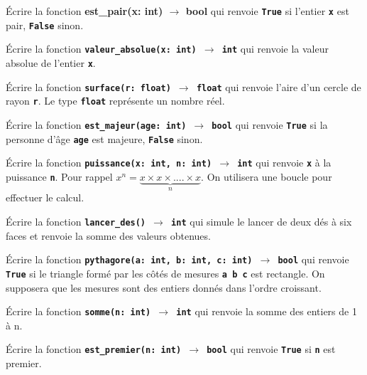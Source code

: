\documentclass[a4paper,11pt]{article}
\begin{document}
\begin{exo}
    Écrire la fonction \textbf{est\_pair(x: int) $\rightarrow$ bool} qui renvoie \textbf{\texttt{True}} si l'entier \textbf{\texttt{x}} est pair, \textbf{\texttt{False}} sinon.
\end{exo}
\begin{exo}
    Écrire la fonction \texttt{\textbf{valeur\_absolue(x: int) $\rightarrow$ int}} qui renvoie la valeur absolue de l'entier \textbf{\texttt{x}}.
\end{exo}
\begin{exo}
    Écrire la fonction \texttt{\textbf{surface(r: float) $\rightarrow$ float}} qui renvoie l'aire d'un cercle de rayon \textbf{\texttt{r}}. Le type \textbf{\texttt{float}} représente un nombre réel.
\end{exo}
\begin{exo}
    Écrire la fonction \texttt{\textbf{est\_majeur(age: int) $\rightarrow$ bool}} qui renvoie \textbf{\texttt{True}} si la personne d'âge \textbf{\texttt{age}} est majeure, \textbf{\texttt{False}} sinon.
\end{exo}
\begin{exo}
    Écrire la fonction \texttt{\textbf{puissance(x: int, n: int) $\rightarrow$ int}} qui renvoie \textbf{\texttt{x}} à la puissance \textbf{\texttt{n}}. Pour rappel $x^n = \underbrace{x×x×....×x}_{n}$. On utilisera une boucle pour effectuer le calcul.
\end{exo}
\begin{exo}
    Écrire la fonction \textbf{\texttt{lancer\_des() $\rightarrow$ int}} qui simule le lancer de deux dés à six faces et renvoie la somme des valeurs obtenues.
\end{exo}
\begin{exo}
    Écrire la fonction \texttt{\textbf{pythagore(a: int, b: int, c: int) $\rightarrow$ bool}} qui renvoie \textbf{\texttt{True}} si le triangle formé par les côtés de mesures \textbf{\texttt{a b c}} est rectangle. On supposera que les mesures sont des entiers donnés dans l'ordre croissant.
\end{exo}
\begin{exo}
    Écrire la fonction \textbf{\texttt{somme(n: int) $\rightarrow$ int}} qui renvoie la somme des entiers de 1 à n.
\end{exo}
\begin{exo}
    Écrire la fonction \textbf{\texttt{est\_premier(n: int) $\rightarrow$ bool}} qui renvoie \textbf{\texttt{True}} si \textbf{\texttt{n}} est premier.
\end{exo}
\end{document}
